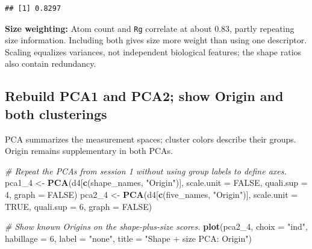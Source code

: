 \documentclass[
  10pt,
]{article}
\newenvironment{Shaded}{\begin{snugshade}}{\end{snugshade}}
\newcommand{\AttributeTok}[1]{\textcolor[rgb]{0.13,0.29,0.53}{#1}}
\newcommand{\CommentTok}[1]{\textcolor[rgb]{0.56,0.35,0.01}{\textit{#1}}}
\newcommand{\ConstantTok}[1]{\textcolor[rgb]{0.56,0.35,0.01}{#1}}
\newcommand{\DecValTok}[1]{\textcolor[rgb]{0.00,0.00,0.81}{#1}}
\newcommand{\FunctionTok}[1]{\textcolor[rgb]{0.13,0.29,0.53}{\textbf{#1}}}
\newcommand{\NormalTok}[1]{#1}
\newcommand{\OtherTok}[1]{\textcolor[rgb]{0.56,0.35,0.01}{#1}}
\newcommand{\StringTok}[1]{\textcolor[rgb]{0.31,0.60,0.02}{#1}}
\begin{document}
\begin{verbatim}
## [1] 0.8297
\end{verbatim}

\textbf{Size weighting:} Atom count and \texttt{Rg} correlate at about
0.83, partly repeating size information. Including both gives size more
weight than using one descriptor. Scaling equalizes variances, not
independent biological features; the shape ratios also contain
redundancy.

\subsection{Rebuild PCA1 and PCA2; show Origin and both
clusterings}\label{rebuild-pca1-and-pca2-show-origin-and-both-clusterings}

PCA summarizes the measurement spaces; cluster colors describe their
groups. Origin remains supplementary in both PCAs.

\begin{Shaded}
\begin{Highlighting}[]
\CommentTok{\# Repeat the PCAs from session 1 without using group labels to define axes.}
\NormalTok{pca1\_4 }\OtherTok{\textless{}{-}} \FunctionTok{PCA}\NormalTok{(d4[}\FunctionTok{c}\NormalTok{(shape\_names, }\StringTok{"Origin"}\NormalTok{)], }\AttributeTok{scale.unit =} \ConstantTok{FALSE}\NormalTok{,}
              \AttributeTok{quali.sup =} \DecValTok{4}\NormalTok{, }\AttributeTok{graph =} \ConstantTok{FALSE}\NormalTok{)}
\NormalTok{pca2\_4 }\OtherTok{\textless{}{-}} \FunctionTok{PCA}\NormalTok{(d4[}\FunctionTok{c}\NormalTok{(five\_names, }\StringTok{"Origin"}\NormalTok{)], }\AttributeTok{scale.unit =} \ConstantTok{TRUE}\NormalTok{,}
              \AttributeTok{quali.sup =} \DecValTok{6}\NormalTok{, }\AttributeTok{graph =} \ConstantTok{FALSE}\NormalTok{)}
\end{Highlighting}
\end{Shaded}

\begin{Shaded}
\begin{Highlighting}[]
\CommentTok{\# Show known Origins on the shape{-}plus{-}size scores.}
\FunctionTok{plot}\NormalTok{(pca2\_4, }\AttributeTok{choix =} \StringTok{"ind"}\NormalTok{, }\AttributeTok{habillage =} \DecValTok{6}\NormalTok{, }\AttributeTok{label =} \StringTok{"none"}\NormalTok{,}
     \AttributeTok{title =} \StringTok{"Shape + size PCA: Origin"}\NormalTok{)}
\end{Highlighting}
\end{Shaded}
\end{document}

